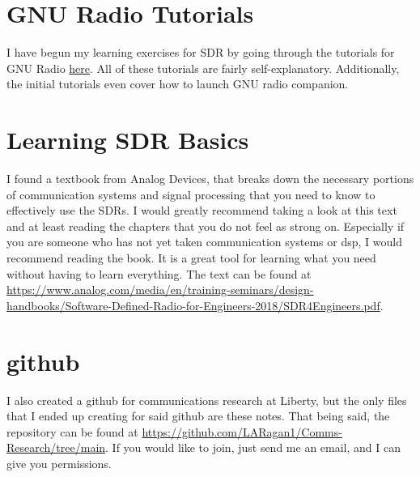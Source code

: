 \documentclass{article}
\begin{document}
\section{GNU Radio Tutorials}
I have begun my learning exercises for SDR by going through the 
tutorials for GNU Radio \href{https://wiki.gnuradio.org/index.php?title=Tutorials}{here}.
All of these tutorials are fairly self-explanatory. Additionally, the initial tutorials even
cover how to launch GNU radio companion.

\section{Learning SDR Basics}
I found a textbook from Analog Devices, that breaks down the necessary portions of communication systems and
signal processing that you need to know to effectively use the SDRs. I would greatly recommend taking
a look at this text and at least reading the chapters that you do not feel as strong on. Especially
if you are someone who has not yet taken communication systems or dsp, I would recommend reading the book.
It is a great tool for learning what you need without having to learn everything. The text can be 
found at \url{https://www.analog.com/media/en/training-seminars/design-handbooks/Software-Defined-Radio-for-Engineers-2018/SDR4Engineers.pdf}.

\section{github}
I also created a github for communications research at Liberty, but the only files that I ended up creating for
said github are these notes. That being said, the repository can be found at \url{https://github.com/LARagan1/Comms-Research/tree/main}.
If you would like to join, just send me an email, and I can give you permissions.
\end{document}
